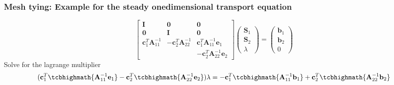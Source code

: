 \documentclass[10pt,xcolor=dvipsnames]{beamer}
\begin{document}
\begin{frame}[t]

 \frametitle{Mesh tying: Example for the steady onedimensional transport equation}
 \begin{equation*}
  \begin{bmatrix}
   \mathbf I & \mathbf0 & \mathbf 0\\
   \mathbf0 & \mathbf I & \mathbf 0\\
   \mathbf c_1^T\mathbf{A}_{11}^{-1} & -\mathbf c_2^T\mathbf{A}_{22}^{-1} & \mathbf c_1^T\mathbf{A}_{11}^{-1}\mathbf{e}_1\\
    & & - \mathbf c_2^T\mathbf{A}_{22}^{-1}\mathbf{e}_2
  \end{bmatrix}\begin{pmatrix}\mathbf S_1 \\ \mathbf S_2 \\ \lambda \end{pmatrix}
 = \begin{pmatrix}
    \mathbf b_1 \\ \mathbf b_2 \\ 0
   \end{pmatrix}
 \end{equation*}
\justifying Solve for the lagrange multiplier
 \begin{equation*}
  (\mathbf c_1^T\tcbhighmath{\mathbf{A}_{11}^{-1}\mathbf{e}_1}  - \mathbf c_2^T\tcbhighmath{\mathbf{A}_{22}^{-1}\mathbf{e}_2})\lambda  = -\mathbf c_1^T\tcbhighmath{\mathbf A_{11}^{-1}\mathbf b_1} + \mathbf c_2^T\tcbhighmath{\mathbf A_{22}^{-1}\mathbf b_2}
 \end{equation*}


 \end{frame}
\end{document}
